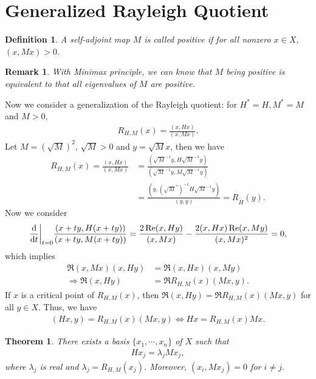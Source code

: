 \documentclass[11pt]{book}
\newtheorem{definition}{Definition}[section]
\newtheorem{theorem}{Theorem}[section]
\newtheorem{remark}{Remark}[section]
\theoremstyle{definition}
\numberwithin{equation}{chapter}
\begin{document}
\medskip

\section{Generalized Rayleigh Quotient}

\begin{definition}
A self-adjoint map $M$ is called positive if for all nonzero $x\in X$, $(x, Mx) > 0$.
\end{definition}

\begin{remark}
With Minimax principle, we can know that $M$ being positive is equivalent to that all eigenvalues of $M$ are positive.
\end{remark}

Now we consider a generalization of the Rayleigh quotient: for $H^* = H, M^* = M$ and $M > 0$, 
\begin{align*}
    R_{H,M}(x) = \frac{(x,Hx)}{(x,Mx)}.
\end{align*}
Let $M = \left(\sqrt{M}\right)^2$, $\sqrt{M} > 0$ and $y = \sqrt{M} x$, then we have
\begin{align*}
    R_{H,M}(x) = \frac{(x,Hx)}{(x,Mx)} & = \frac{\left(\sqrt{M}^{-1}y, H\sqrt{M}^{-1}y\right)}{\left(\sqrt{M}^{-1}y, M\sqrt{M}^{-1}y\right)} \\
    & = \frac{\left(y,\left(\sqrt{M}^*\right)^{-1}H \sqrt{M}^{-1} y \right)}{(y,y)} = R_{\widetilde{H}}(y).
\end{align*}
Now we consider
\begin{align*}
    \dv{}{t}\bigg|_{t = 0} \frac{\left(x+ty,H(x+ty)\right)}{\left(x+ty,M(x+ty)\right)} = \frac{2\Re(x,Hy)}{(x,Mx)} - \frac{2(x,Hx)\Re(x,My)}{(x,Mx)^2} = 0,
\end{align*}
which implies 
\begin{align*}
    \Re(x,Mx)(x,Hy) & = \Re(x,Hx)(x,My) \\
    \Rightarrow \Re(x,Hy) & = \Re R_{H,M}(x) (Mx,y).
\end{align*}
If $x$ is a critical point of $R_{H,M}(x)$, then $\Re(x,Hy)  = \Re R_{H,M}(x) (Mx,y)$ for all $y\in X$. Thus, we have
\begin{align*}
    (Hx, y) = R_{H,M}(x) (Mx,y) \iff Hx = R_{H,M}(x) Mx.
\end{align*}

\medskip

\begin{theorem}
There exists a basis $\{x_1,\cdots,x_n\}$ of $X$ such that 
\begin{align*}
    Hx_j = \lambda_j M x_j, 
\end{align*}
where $\lambda_j$ is real and $\lambda_j = R_{H,M}(x_j)$. Moreover, $\left(x_i, Mx_j\right) = 0$ for $i\neq j$.
\end{theorem}
\end{document}
